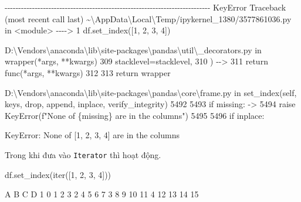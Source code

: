 \documentclass[
]{book}
\newenvironment{Shaded}{\begin{snugshade}}{\end{snugshade}}
\newcommand{\BuiltInTok}[1]{#1}
\newcommand{\DecValTok}[1]{\textcolor[rgb]{0.00,0.00,0.81}{#1}}
\newcommand{\NormalTok}[1]{#1}
\begin{document}
\begin{Shaded}
\begin{Highlighting}[]
\NormalTok{{-}{-}{-}{-}{-}{-}{-}{-}{-}{-}{-}{-}{-}{-}{-}{-}{-}{-}{-}{-}{-}{-}{-}{-}{-}{-}{-}{-}{-}{-}{-}{-}{-}{-}{-}{-}{-}{-}{-}{-}{-}{-}{-}{-}{-}{-}{-}{-}{-}{-}{-}{-}{-}{-}{-}{-}{-}{-}{-}{-}{-}{-}{-}{-}{-}{-}{-}{-}{-}{-}{-}{-}{-}{-}{-}}
\NormalTok{KeyError                                  Traceback (most recent call last)}
\NormalTok{\textasciitilde{}\textbackslash{}AppData\textbackslash{}Local\textbackslash{}Temp/ipykernel\_1380/3577861036.py in \textless{}module\textgreater{}}
\NormalTok{{-}{-}{-}{-}\textgreater{} 1 df.set\_index([1, 2, 3, 4])}

\NormalTok{D:\textbackslash{}Vendors\textbackslash{}anaconda\textbackslash{}lib\textbackslash{}site{-}packages\textbackslash{}pandas\textbackslash{}util\textbackslash{}\_decorators.py in wrapper(*args, **kwargs)}
\NormalTok{    309                     stacklevel=stacklevel,}
\NormalTok{    310                 )}
\NormalTok{{-}{-}\textgreater{} 311             return func(*args, **kwargs)}
\NormalTok{    312 }
\NormalTok{    313         return wrapper}

\NormalTok{D:\textbackslash{}Vendors\textbackslash{}anaconda\textbackslash{}lib\textbackslash{}site{-}packages\textbackslash{}pandas\textbackslash{}core\textbackslash{}frame.py in set\_index(self, keys, drop, append, inplace, verify\_integrity)}
\NormalTok{   5492 }
\NormalTok{   5493         if missing:}
\NormalTok{{-}\textgreater{} 5494             raise KeyError(f"None of \{missing\} are in the columns")}
\NormalTok{   5495 }
\NormalTok{   5496         if inplace:}

\NormalTok{KeyError: \textquotesingle{}None of [1, 2, 3, 4] are in the columns\textquotesingle{}}
\end{Highlighting}
\end{Shaded}

Trong khi đưa vào \texttt{Iterator} thì hoạt động.

\begin{Shaded}
\begin{Highlighting}[]
\NormalTok{df.set\_index(}\BuiltInTok{iter}\NormalTok{([}\DecValTok{1}\NormalTok{, }\DecValTok{2}\NormalTok{, }\DecValTok{3}\NormalTok{, }\DecValTok{4}\NormalTok{]))}
\end{Highlighting}
\end{Shaded}

\begin{Shaded}
\begin{Highlighting}[]
\NormalTok{    A   B   C   D}
\NormalTok{1   0   1   2   3}
\NormalTok{2   4   5   6   7}
\NormalTok{3   8   9  10  11}
\NormalTok{4  12  13  14  15}
\end{Highlighting}
\end{Shaded}
\end{document}
